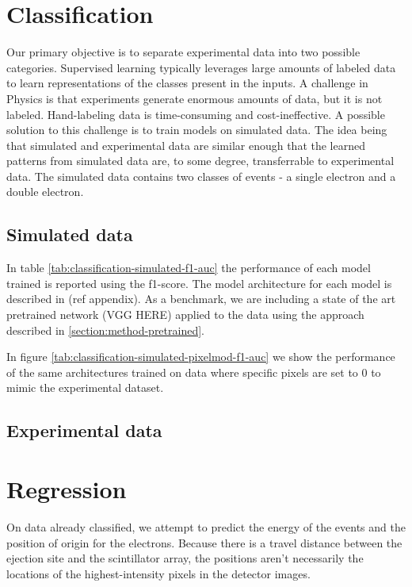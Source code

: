 \section{Classification}
Our primary objective is to separate experimental data into two possible categories.
Supervised learning typically leverages large amounts of labeled data to learn
representations of the classes present in the inputs. A challenge in Physics is that
experiments generate enormous amounts of data, but it is not labeled. Hand-labeling
data is time-consuming and cost-ineffective. A possible solution to this challenge
is to train models on simulated data. The idea being that simulated and experimental
data are similar enough that the learned patterns from simulated data are, to some degree,
transferrable to experimental data.
The simulated data contains two classes of events - a single electron and a double electron.

\subsection{Simulated data}
In table \ref{tab:classification-simulated-f1-auc} the performance of each model 
trained is reported using the f1-score. The model architecture for each model is described in (ref appendix).
As a benchmark, we are including a state of the art pretrained network (\cite{}VGG HERE) applied to the data 
using the approach described in \ref{section:method-pretrained}.

In figure \ref{tab:classification-simulated-pixelmod-f1-auc} we show the performance
of the same architectures trained on data where specific pixels are set to 0 to mimic
the experimental dataset.



\subsection{Experimental data}

\section{Regression}
On data already classified, we attempt to predict the energy of the events and the position of origin for
the electrons. Because there is a travel distance between the ejection site and the scintillator array,
the positions aren't necessarily the locations of the highest-intensity pixels in the detector images.
